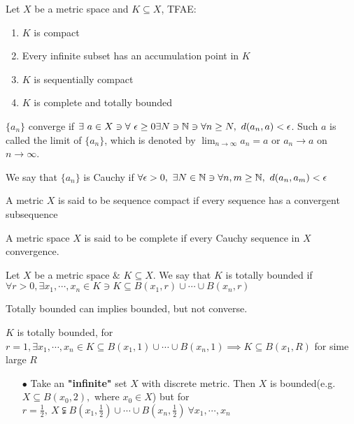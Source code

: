 \begin{thm}
	Let $X$ be a metric space and $K \subseteq X$, TFAE:
	
	\begin{enumerate}[wide,label=(\roman*)]
		\item $K$ is compact
		\item Every infinite subset has an accumulation point in $K$
		\item $K$ is sequentially compact
		\item $K$ is complete and totally bounded
	\end{enumerate}
\end{thm}

\begin{defn}[Convergence]
	$\{a_n\}$ converge if $\exists ~ a \in X \ni \forall~\epsilon \geq 0 \exists N \ni \mathbb{N} \ni \forall n \geq N,~d(a_n,a) < \epsilon$. Such $a$ is called the limit of $\{a_n\}$, which is denoted by $\lim_{n \rightarrow \infty} a_n = a$ or $a_n \rightarrow a$ on $n \rightarrow \infty$. 
	
\end{defn}

\begin{defn}[Cauchy]
	We say that $\{a_n\}$ is Cauchy if $\forall \epsilon > 0,~\exists N \in \mathbb{N} \ni \forall n,m \geq \mathbb{N},~d(a_n,a_m) < \epsilon$
\end{defn}

\begin{defn}
	A metric $X$ is said to be sequence compact if every sequence has a convergent subsequence
\end{defn}


\begin{defn}
	A metric space $X$ is said to be complete if every Cauchy sequence in $X$ convergence.
\end{defn}

\begin{defn}
	Let $X$ be a metric space $\&$ $K \subseteq X$. We say that $K$ is totally bounded if $\forall r > 0, \exists x_1,\cdots,x_n \in K \ni K \subseteq B(x_1,r) \cup \cdots \cup B(x_n,r)$
\end{defn}

\begin{rmk*}
	Totally bounded can implies bounded, but not converse.
	
	$K$ is totally bounded, for $r=1, \exists x_1,\cdots,x_n \in K \subseteq B(x_1,1) \cup \cdots \cup B(x_n,1) \implies K \subseteq B(x_1,R)$ for sime large $R$
	
	\begin{enumerate}[]
		\item[$\bullet$] Take an \textbf{"infinite"} set $X$ with discrete metric. Then $X$ is bounded(e.g. $X \subseteq B(x_0,2),$ where $x_0\in X$) but for $r = \frac{1}{2},~X \subsetneqq B(x_1,\frac{1}{2}) \cup \cdots \cup B(x_n,\frac{1}{2}) ~\forall x_1,\cdots,x_n$ 
	\end{enumerate}
\end{rmk*}

